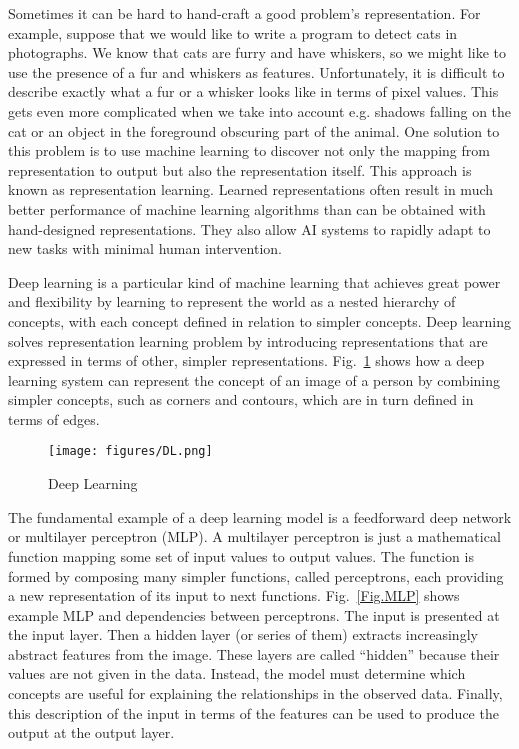 Sometimes it can be hard to hand-craft a good problem's representation. For example, suppose that we would like to write a program to detect cats in photographs. We know that cats are furry and have whiskers, so we might like to use the presence of a fur and whiskers as features. Unfortunately, it is difficult to describe exactly what a fur or a whisker looks like in terms of pixel values. This gets even more complicated when we take into account e.g. shadows falling on the cat or an object in the foreground obscuring part of the animal.
One solution to this problem is to use machine learning to discover not only the mapping from representation to output but also the representation itself. This approach is known as representation learning. Learned representations often result in much better performance of machine learning algorithms than can be obtained with hand-designed representations. They also allow AI systems to rapidly adapt to new tasks with minimal human intervention.

Deep learning is a particular kind of machine learning that achieves great power and flexibility by learning to represent the world as a nested hierarchy of concepts, with each concept defined in relation to simpler concepts. Deep learning solves representation learning problem by introducing representations that are expressed in terms of other, simpler representations. Fig.~\ref{Fig.DL} shows how a deep learning system can represent the concept of an image of a person by combining simpler concepts, such as corners and contours, which are in turn defined in terms of edges.

\begin{figure}[H]
\texttt{[image: figures/DL.png]}
\caption[Deep Learning]{Deep Learning\protect\cite{Book.DeepLearning}}
\label{Fig.DL}
\end{figure}

The fundamental example of a deep learning model is a feedforward deep network or multilayer perceptron (MLP). A multilayer perceptron is just a mathematical function mapping some set of input values to output values. The function is formed by composing many simpler functions, called perceptrons, each providing a new representation of its input to next functions. Fig.~\ref{Fig.MLP} shows example MLP and dependencies between perceptrons. The input is presented at the input layer. Then a hidden layer (or series of them) extracts increasingly abstract features from the image. These layers are called “hidden” because their values are not given in the data. Instead, the model must determine which concepts are useful for explaining the relationships in the observed data. Finally, this description of the input in terms of the features can be used to produce the output at the output layer.

